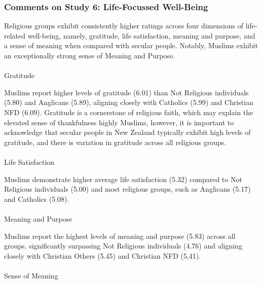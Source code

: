 \documentclass[
  single column]{article}
\makeatletter
\let\oldparagraph\paragraph
\renewcommand{\paragraph}{
    \@ifstar
      \xxxParagraphStar
      \xxxParagraphNoStar
  }
\newcommand{\xxxParagraphStar}[1]{\oldparagraph*{#1}\mbox{}}
\newcommand{\xxxParagraphNoStar}[1]{\oldparagraph{#1}\mbox{}}
\makeatother
\begin{document}
\subsubsection{Comments on Study 6: Life-Focussed
Well-Being}\label{comments-on-study-6-life-focussed-well-being}

Religious groups exhibit consistently higher ratings across four
dimensions of life-related well-being, namely, gratitude, life
satisfaction, meaning and purpose, and a sense of meaning when compared
with secular people. Notably, Muslims exhibit an exceptionally strong
sense of Meaning and Purpose.

\paragraph{Gratitude}\label{gratitude}

Muslims report higher levels of gratitude (6.01) than Not Religious
individuals (5.80) and Anglicans (5.89), aligning closely with Catholics
(5.99) and Christian NFD (6.09). Gratitude is a cornerstone of religious
faith, which may explain the elevated sense of thankfulness highly
Muslims, however, it is important to acknowledge that secular people in
New Zealand typically exhibit high levels of gratitude, and there is
variation in gratitude across all religious groups.

\paragraph{Life Satisfaction}\label{life-satisfaction}

Muslims demonstrate higher average life satisfaction (5.32) compared to
Not Religious individuals (5.00) and most religious groups, such as
Anglicans (5.17) and Catholics (5.08).

\paragraph{Meaning and Purpose}\label{meaning-and-purpose}

Muslims report the highest levels of meaning and purpose (5.83) across
all groups, significantly surpassing Not Religious individuals (4.76)
and aligning closely with Christian Others (5.45) and Christian NFD
(5.41).

\paragraph{Sense of Meaning}\label{sense-of-meaning}
\end{document}
